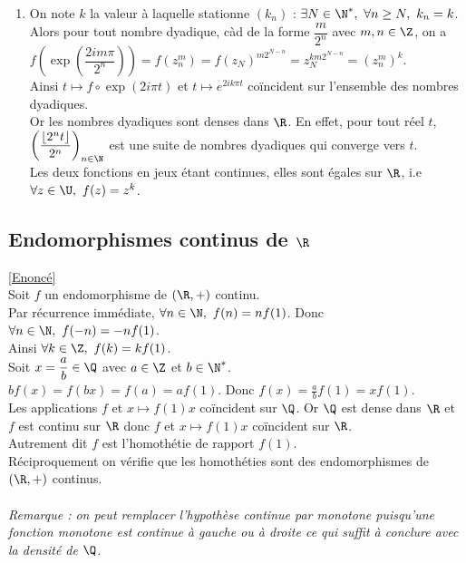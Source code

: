 \documentclass[8pt]{book}
\begin{document}
\begin{enumerate}[leftmargin=*]
		Mais alors $\forall n\geq N,\ |k_{n+1}-k_n|<\dfrac{1}{3}(2^{n+1}+2^n)=2^n$. On en déduit que $\forall n\geq N,\ k_{n+1}-k_n=0$.\\
		Autrement dit $(k_n)$ est stationnaire.
		\item On note $k$ la valeur à laquelle stationne $(k_n)$ : $\exists N\in \N^*,\ \forall n\geq N,\ k_n=k$.\\
		Alors pour tout nombre dyadique, càd de la forme $\dfrac{m}{2^n}$ avec $m,n\in \Z$, on a $f\left(\exp\left(\dfrac{2im\pi}{2^n}\right)\right)=f(z_n^m)=f(z_N)^{m2^{N-n}}=z_N^{km2^{N-n}}=(z_n^m)^k$.\\
		Ainsi $t\mapsto f\circ \exp(2i\pi t)$ et $t\mapsto e^{2ik\pi t}$ coïncident sur l'ensemble des nombres dyadiques.\\
		Or les nombres dyadiques sont denses dans $\R$. En effet, pour tout réel $t$, $\left(\dfrac{\lfloor2^nt\rfloor}{2^n}\right)_{n\in \N}$ est une suite de nombres dyadiques qui converge vers $t$.\\
		Les deux fonctions en jeux étant continues, elles sont égales sur $\R$, i.e $\forall z\in \U,\ f(z)=z^k$.
	\end{enumerate}
	
	\subsection{Endomorphismes continus de $\R$ }
	\label{Endomorphismes continus de R corrigé}
	\textcolor{blue}{\hyperref[Endomorphismes continus de R]{[Enoncé]}}\\
	Soit $f$ un endomorphisme de $(\R,+)$ continu.\\
	Par récurrence immédiate, $\forall n\in \N,\ f(n)=nf(1)$. Donc $\forall n\in \N,\ f(-n)=-nf(1)$.\\
	Ainsi $\forall k\in \Z,\ f(k)=kf(1)$.\\
	Soit $x=\displaystyle\frac{a}{b}\in \Q$ avec $a\in \Z$ et $b\in \N^*$.\\
	$bf(x)=f(bx)=f(a)=af(1)$. Donc $f(x)=\displaystyle\frac{a}{b}f(1)=xf(1)$.\\
	Les applications $f$ et $x\mapsto f(1)x$ coïncident sur $\Q$. Or $\Q$ est dense dans $\R$ et $f$ est continu sur $\R$ donc $f$ et $x\mapsto f(1)x$ coïncident sur $\R$.\\
	Autrement dit $f$ est l'homothétie de rapport $f(1)$.\\
	Réciproquement on vérifie que les homothéties sont des endomorphismes de $(\R,+)$ continus.\\\\
	\textit{Remarque : on peut remplacer l'hypothèse continue par monotone puisqu'une fonction monotone est continue à gauche ou à droite ce qui suffit à conclure avec la densité de $\Q$.}
	
\end{document}

